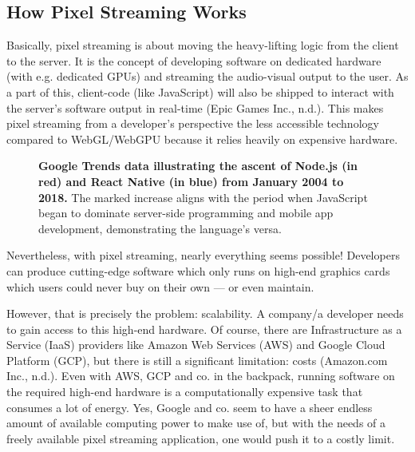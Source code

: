 \documentclass[10pt]{article}
\begin{document}
\begin{sloppypar}
  \subsection{How Pixel Streaming Works}
  \label{subsec:how-pixel-streaming-works}

  Basically, pixel streaming is about moving the heavy-lifting logic from the client to the server. It is the concept of developing software on dedicated hardware (with e.g. dedicated GPUs) and streaming the audio-visual output to the user. As a part of this, client-code (like JavaScript) will also be shipped to interact with the server’s software output in real-time (Epic Games Inc., n.d.). This makes pixel streaming from a developer’s perspective the less accessible technology compared to WebGL/WebGPU because it relies heavily on expensive hardware.

  \begin{figure}[ht]
    \centering
    \caption[Google Trends data illustrating the ascent of Node.js and React Native.]{\textbf{Google Trends data illustrating the ascent of Node.js (in red) and React Native (in blue) from January 2004 to 2018.} The marked increase aligns with the period when JavaScript began to dominate server-side programming and mobile app development, demonstrating the language's versa.}
    \label{fig:pixel-streaming-architecture}
  \end{figure}

  Nevertheless, with pixel streaming, nearly everything seems possible! Developers can produce cutting-edge software which only runs on high-end graphics cards which users could never buy on their own — or even maintain.

  However, that is precisely the problem: scalability. A company/a developer needs to gain access to this high-end hardware. Of course, there are Infrastructure as a Service (IaaS) providers like Amazon Web Services (AWS) and Google Cloud Platform (GCP), but there is still a significant limitation: costs (Amazon.com Inc., n.d.). Even with AWS, GCP and co. in the backpack, running software on the required high-end hardware is a computationally expensive task that consumes a lot of energy. Yes, Google and co. seem to have a sheer endless amount of available computing power to make use of, but with the needs of a freely available pixel streaming application, one would push it to a costly limit.


\end{sloppypar}
\end{document}
